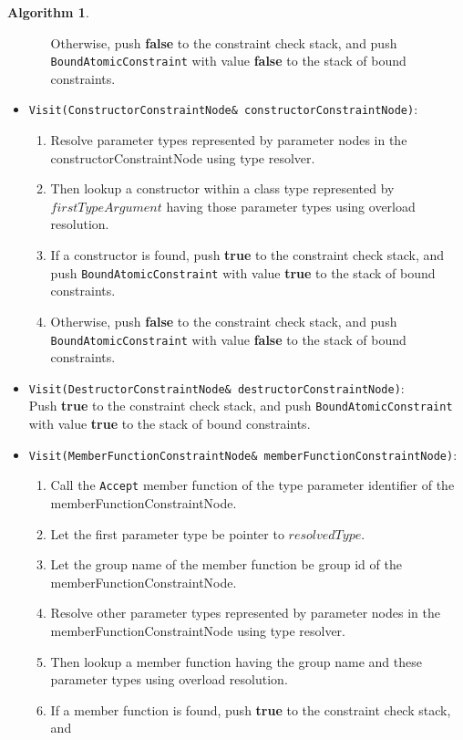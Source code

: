 \documentclass[a4paper,oneside,11pt]{book}
\theoremstyle{definition}
\newtheorem{algo}{Algorithm}[section]
\begin{document}
\begin{algo}
\begin{itemize}
\begin{enumerate}
Otherwise, push \textbf{false} to the constraint check stack, and push
\verb|BoundAtomicConstraint| with value \textbf{false} to the stack of bound constraints.
\end{enumerate}
\item
\verb|Visit(ConstructorConstraintNode& constructorConstraintNode)|:\\
\begin{enumerate}
\item
Resolve parameter types represented by parameter nodes in the constructorConstraintNode using type resolver.
\item
Then lookup a constructor within a class type represented by $firstTypeArgument$ having those parameter types using overload resolution.
\item
If a constructor is found, push \textbf{true} to the constraint check stack, and
push \verb|BoundAtomicConstraint| with value \textbf{true} to the stack of bound constraints.
\item
Otherwise, push \textbf{false} to the constraint check stack, and
push \verb|BoundAtomicConstraint| with value \textbf{false} to the stack of bound constraints.
\end{enumerate}
\item
\verb|Visit(DestructorConstraintNode& destructorConstraintNode)|:\\
Push \textbf{true} to the constraint check stack, and
push \verb|BoundAtomicConstraint| with value \textbf{true} to the stack of bound constraints.
\item
\verb|Visit(MemberFunctionConstraintNode& memberFunctionConstraintNode)|:\\
\begin{enumerate}
\item
Call the \verb|Accept| member function of the type parameter identifier of the memberFunctionConstraintNode.
\item
Let the first parameter type be pointer to $resolvedType$.
\item
Let the group name of the member function be group id of the memberFunctionConstraintNode.
\item
Resolve other parameter types represented by parameter nodes in the memberFunctionConstraintNode using type resolver.
\item
Then lookup a member function having the group name and these parameter types using overload resolution.
\item
If a member function is found, push \textbf{true} to the constraint check stack, and

\end{enumerate}
\end{itemize}
\end{algo}
\end{document}
